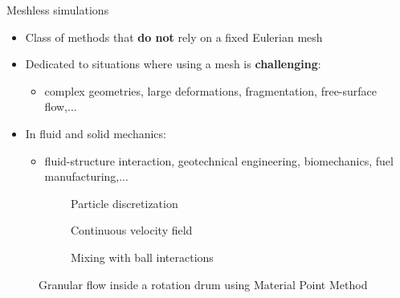 \documentclass[aspectratio=169]{beamer} %
\begin{document}
\begin{frame}{Meshless simulations}
    \begin{itemize}
        \item Class of methods that \textbf{do not} rely on a fixed Eulerian mesh
        \item Dedicated to situations where using a mesh is \textbf{challenging}: \\
              \begin{itemize}
                  \item complex geometries, large deformations, fragmentation, free-surface flow,...
              \end{itemize}
        \item In fluid and solid mechanics:
              \begin{itemize}
                  \item fluid-structure interaction, geotechnical engineering, biomechanics, fuel manufacturing,...
              \end{itemize}
    \end{itemize}
    \vfill
    \begin{figure}
        \begin{subfigure}{0.32\textwidth}
            \caption*{\tiny Particle discretization}
        \end{subfigure}
        \begin{subfigure}{0.32\textwidth}
            \caption*{\tiny Continuous velocity field}
        \end{subfigure}
        \begin{subfigure}{0.32\textwidth}
            \caption*{\tiny Mixing with ball interactions}
        \end{subfigure}
        \vspace{-0.5cm}
        \caption*{\footnotesize Granular flow inside a rotation drum using Material Point Method}
    \end{figure}
    \vspace{-0.5cm}
\end{frame}
\end{document}
